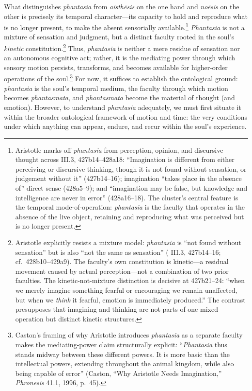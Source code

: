 \documentclass{article}
\begin{document}
What distinguishes \textit{phantasia} from \textit{aisthēsis} on the one hand and \textit{noēsis} on the other is precisely its temporal character---its capacity to hold and reproduce what is no longer present, to make the absent sensorially available.\footnote{Aristotle marks off \textit{phantasia} from perception, opinion, and discursive thought across \cite{aristotle2014soul} III.3, 427b14--428a18: ``Imagination is different from either perceiving or discursive thinking, though it is not found without sensation, or judgement without it'' (427b14--16); imagination ``takes place in the absence of'' direct sense (428a5--9); and ``imagination may be false, but knowledge and intelligence are never in error'' (428a16--18). The cluster's central feature is the temporal mode-of-operation: \textit{phantasia} is the faculty that operates in the absence of the live object, retaining and reproducing what was perceived but is no longer present.} \textit{Phantasia} is not a mixture of sensation and judgment, but a distinct faculty rooted in the soul's \textit{kinetic} constitution.\footnote{Aristotle explicitly resists a mixture model: \textit{phantasia} is ``not found without sensation'' but is also ``not the same as sensation'' (\cite{aristotle2014soul} III.3, 427b14--16; cf.~428b10--429a9). The faculty's own constitution is kinetic---a residual movement caused by actual perception---not a combination of two prior faculties. The kinetic-not-mixture distinction is decisive at 427b21--24: ``when we merely imagine something fearful or encouraging we remain unaffected, but when we \textit{think} it fearful, emotion is immediately produced.'' The contrast presupposes that imagining and thinking are not parts of one mixed operation but distinct kinetic structures.} Thus, \textit{phantasia} is neither a mere residue of sensation nor an autonomous cognitive act; rather, it is the mediating power through which sensory motion persists, transforms, and becomes available for higher-order operations of the soul.\footnote{Caston's framing of why Aristotle introduces \textit{phantasia} as a separate faculty makes the mediating-power claim structurally explicit: ``\textit{Phantasia} thus stands midway between these different powers. It is more basic than the intellectual powers, extending throughout the animal kingdom, while also being capable of error'' (Caston, ``Why Aristotle Needs Imagination,'' \textit{Phronesis} 41.1, 1996, p.~45).} For now, it suffices to establish the ontological ground: \textit{phantasia} is the soul's temporal medium, the faculty through which motion becomes \textit{phantasmata}, and \textit{phantasmata} become the material of thought (and emotion). However, to understand \textit{phantasia} adequately, we must first situate it within the broader ontological framework of motion and time: the very conditions under which anything can appear, endure, and recur within the soul's experience.
\end{document}
